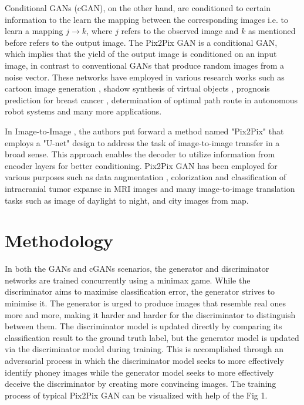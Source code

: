 \documentclass{36_styles/svproc}
\begin{document}
Conditional GANs (cGAN), on the other hand, are conditioned to certain information to the learn the mapping between the corresponding images \cite{mirza2014conditional} i.e. to learn a mapping $j \rightarrow k$, where $j$ refers to the observed image and $k$ as mentioned before refers to the output image. The Pix2Pix GAN is a conditional GAN, which implies that the yield of the output image is conditioned on an input image, in contrast to conventional GANs that produce random images from a noise vector. These networks have employed in various research works such as cartoon image generation \cite{liu2017autopainter}, shadow synthesis of virtual objects \cite{Zhang2019}, prognosis prediction for breast cancer \cite{Zhang2022}, determination of optimal path route in autonomous robot systems \cite{9366777} and many more applications. 

In Image-to-Image \cite{isola2018imagetoimage}, the authors put forward a method named "Pix2Pix" that employs a "U-net" design \cite{ronneberger2015unet} to address the task of image-to-image transfer in a broad sense. This approach enables the decoder to utilize information from encoder layers for better conditioning. Pix2Pix GAN has been employed for various purposes such as data augmentation \cite{Toda2022} \cite{Hlscher2022}, colorization and classification of intracranial tumor expanse in MRI images \cite{Mehmood2022} and many image-to-image translation tasks such as image of daylight to night, and city images from map.

\section{Methodology}
In both the GANs and cGANs scenarios, the generator and discriminator networks are trained concurrently using a minimax game. While the discriminator aims to maximise classification error, the generator strives to minimise it. The generator is urged to produce images that resemble real ones more and more, making it harder and harder for the discriminator to distinguish between them. The discriminator model is updated directly by comparing its classification result to the ground truth label, but the generator model is updated via the discriminator model during training. This is accomplished through an adversarial process in which the discriminator model seeks to more effectively identify phoney images while the generator model seeks to more effectively deceive the discriminator by creating more convincing images. The training process of typical Pix2Pix GAN can be visualized with help of the Fig 1.
\end{document}
